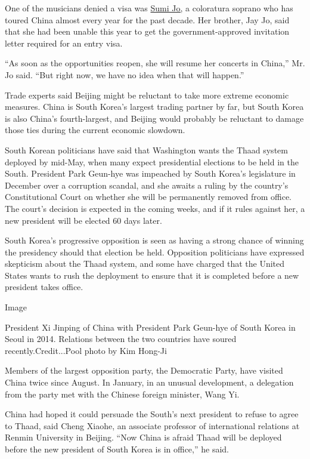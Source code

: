 One of the musicians denied a visa was
\href{https://www.nytimes3xbfgragh.onion/2017/01/23/world/asia/sumi-jo-soprano-maria-callas.html}{Sumi
Jo,} a coloratura soprano who has toured China almost every year for the
past decade. Her brother, Jay Jo, said that she had been unable this
year to get the government-approved invitation letter required for an
entry visa.

``As soon as the opportunities reopen, she will resume her concerts in
China,'' Mr. Jo said. ``But right now, we have no idea when that will
happen.''

Trade experts said Beijing might be reluctant to take more extreme
economic measures. China is South Korea's largest trading partner by
far, but South Korea is also China's fourth-largest, and Beijing would
probably be reluctant to damage those ties during the current economic
slowdown.

South Korean politicians have said that Washington wants the Thaad
system deployed by mid-May, when many expect presidential elections to
be held in the South. President Park Geun-hye was impeached by South
Korea's legislature in December over a corruption scandal, and she
awaits a ruling by the country's Constitutional Court on whether she
will be permanently removed from office. The court's decision is
expected in the coming weeks, and if it rules against her, a new
president will be elected 60 days later.

South Korea's progressive opposition is seen as having a strong chance
of winning the presidency should that election be held. Opposition
politicians have expressed skepticism about the Thaad system, and some
have charged that the United States wants to rush the deployment to
ensure that it is completed before a new president takes office.

Image

President Xi Jinping of China with President Park Geun-hye of South
Korea in Seoul in 2014. Relations between the two countries have soured
recently.Credit...Pool photo by Kim Hong-Ji

Members of the largest opposition party, the Democratic Party, have
visited China twice since August. In January, in an unusual development,
a delegation from the party met with the Chinese foreign minister, Wang
Yi.

China had hoped it could persuade the South's next president to refuse
to agree to Thaad, said Cheng Xiaohe, an associate professor of
international relations at Renmin University in Beijing. ``Now China is
afraid Thaad will be deployed before the new president of South Korea is
in office,'' he said.

